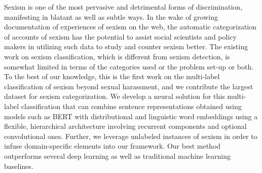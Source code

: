 Sexism is one of the most pervasive and detrimental forms of discrimination, manifesting in blatant as well as subtle ways. In the wake of growing documentation of experiences of sexism on the web, the automatic categorization of accounts of sexism has the potential to assist social scientists and policy makers in utilizing such data to study and counter sexism better. The existing work on sexism classification, which is different from sexism detection, is somewhat limited in terms of the categories used or the problem set-up or both. To the best of our knowledge, this is the first work on the multi-label classification of sexism beyond sexual harassment, and we contribute the largest dataset for sexism categorization. We develop a neural solution for this multi-label classification that can combine sentence representations obtained using models such as BERT with distributional and linguistic word embeddings using a flexible, hierarchical architecture involving recurrent components and optional convolutional ones. Further, we leverage unlabeled instances of sexism in order to infuse domain-specific elements into our framework. Our best method outperforms several deep learning as well as traditional machine learning baselines.